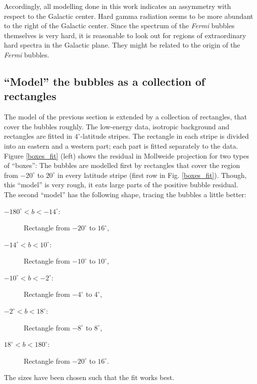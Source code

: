 \documentclass[a4paper]{article}
\begin{document}
Accordingly, all modelling done in this work indicates an assymmetry with respect to the Galactic center. Hard gamma radiation seems to be more abundant to the right of the Galactic center. Since the spectrum of the \textit{Fermi} bubbles themselves is very hard, it is reasonable to look out for regions of extraordinary hard spectra in the Galactic plane. They might be related to the origin of the \textit{Fermi} bubbles.





\subsection{``Model'' the bubbles as a collection of rectangles}

The model of the previous section is extended by a collection of rectangles, that cover the bubbles roughly. The low-energy data, isotropic background and rectangles are fitted in $4^\circ$-latitude stripes. The rectangle in each stripe is divided into an eastern and a western part; each part is fitted separately to the data.\\
Figure \ref{boxes_fit} (left) shows the residual in Mollweide projection for two types of ``boxes'': The bubbles are modelled first by rectangles that cover the region from $-20^\circ$ to $20^\circ$ in every latitude stripe (first row in Fig. \ref{boxes_fit}). Though, this ``model'' is very rough, it eats large parts of the positive bubble residual. \\
The second ``model'' has the following shape, tracing the bubbles a little better:

\begin{description}
\item[$-180^\circ < b < -14^\circ$:] Rectangle from $-20^\circ$ to $16^\circ$,
\item[$-14^\circ < b < 10^\circ$:] Rectangle from $-10^\circ$ to $10^\circ$,
\item[$-10^\circ < b < -2^\circ$:] Rectangle from $-4^\circ$ to $4^\circ$,
\item[$-2^\circ < b < 18^\circ$:] Rectangle from $-8^\circ$ to $8^\circ$,
\item[$18^\circ < b < 180^\circ$:] Rectangle from $-20^\circ$ to $16^\circ$.
\end{description}
The sizes have been chosen such that the fit works best.
 
\end{document}
